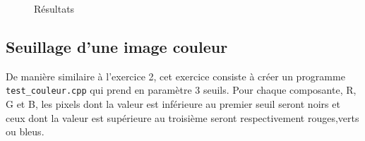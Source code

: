 \documentclass[11pt]{article}
\begin{document}
\begin{figure}[!htb]
  \centering
  \caption{Résultats}
\end{figure}

\FloatBarrier

\clearpage
\subsection{Seuillage d’une image couleur}
De manière similaire à l'exercice 2, cet exercice consiste à créer un programme \texttt{test\_couleur.cpp} qui prend en paramètre 3 seuils. Pour chaque composante, R, G et B, les pixels dont la valeur est inférieure au premier seuil seront noirs et ceux dont la valeur est supérieure au troisième seront respectivement rouges,verts ou bleus.
\end{document}
